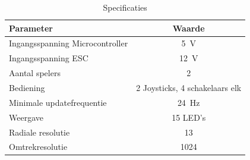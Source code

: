\documentclass[12pt]{ugentreport}
\begin{document}
\begin{table}
  \centering
  \begin{tabular}{l|c}
    \hline
    Parameter & Waarde\\
    \hline
    Ingangsspanning Microcontroller & \SI{5}{\volt}\\
    Ingangsspanning ESC & \SI{12}{\volt}\\
    Aantal spelers & 2\\
    Bediening & 2 Joysticks, 4 schakelaars elk\\
    Minimale updatefrequentie & \SI{24}{\hertz}\\
    Weergave & 15 LED's\\
    Radiale resolutie & 13\\
    Omtrekresolutie & 1024\\
    \hline
  \end{tabular}
  \caption{Specificaties}
  \label{tbl:specs}
\end{table}
\end{document}
